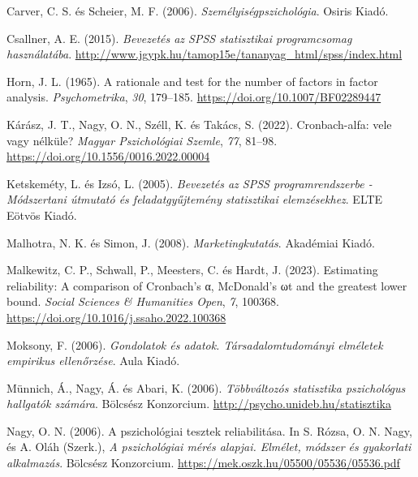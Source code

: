 \documentclass[
  letterpaper,
]{krantz}
\newlength{\cslhangindent}
\newlength{\cslentryspacingunit} %
\newenvironment{CSLReferences}[2] %
 {%
  \setlength{\parindent}{0pt}
  \ifodd #1
  \let\oldpar\par
  \def\par{\hangindent=\cslhangindent\oldpar}
  \fi
  \setlength{\parskip}{#2\cslentryspacingunit}
 }%
 {}
\begin{document}
\hypertarget{refs}{}
\begin{CSLReferences}{1}{0}
\leavevmode{}%
Carver, C. S. és Scheier, M. F. (2006). \emph{Személyiségpszichológia}.
Osiris Kiadó.

\leavevmode{}%
Csallner, A. E. (2015). \emph{Bevezetés az SPSS statisztikai
programcsomag használatába}.
\url{http://www.jgypk.hu/tamop15e/tananyag_html/spss/index.html}

\leavevmode{}%
Horn, J. L. (1965). A rationale and test for the number of factors in
factor analysis. \emph{Psychometrika}, \emph{30}, 179--185.
\url{https://doi.org/10.1007/BF02289447}

\leavevmode{}%
Kárász, J. T., Nagy, O. N., Széll, K. és Takács, S. (2022).
Cronbach-alfa: vele vagy nélküle? \emph{Magyar Pszichológiai Szemle},
\emph{77}, 81--98. \url{https://doi.org/10.1556/0016.2022.00004}

\leavevmode{}%
Ketskeméty, L. és Izsó, L. (2005). \emph{Bevezetés az SPSS
programrendszerbe - Módszertani útmutató és feladatgyűjtemény
statisztikai elemzésekhez}. ELTE Eötvös Kiadó.

\leavevmode{}%
Malhotra, N. K. és Simon, J. (2008). \emph{Marketingkutatás}. Akadémiai
Kiadó.

\leavevmode{}%
Malkewitz, C. P., Schwall, P., Meesters, C. és Hardt, J. (2023).
Estimating reliability: A comparison of Cronbach's α, McDonald's ωt and
the greatest lower bound. \emph{Social Sciences \& Humanities Open},
\emph{7}, 100368. \url{https://doi.org/10.1016/j.ssaho.2022.100368}

\leavevmode{}%
Moksony, F. (2006). \emph{Gondolatok és adatok. Társadalomtudományi
elméletek empirikus ellenőrzése}. Aula Kiadó.

\leavevmode{}%
Münnich, Á., Nagy, Á. és Abari, K. (2006). \emph{Többváltozós
statisztika pszichológus hallgatók számára}. Bölcsész Konzorcium.
\url{http://psycho.unideb.hu/statisztika}

\leavevmode{}%
Nagy, O. N. (2006). A pszichológiai tesztek reliabilitása. In S. Rózsa,
O. N. Nagy, és A. Oláh (Szerk.), \emph{A pszichológiai mérés alapjai.
Elmélet, módszer és gyakorlati alkalmazás}. Bölcsész Konzorcium.
\url{https://mek.oszk.hu/05500/05536/05536.pdf}


\end{CSLReferences}
\end{document}
